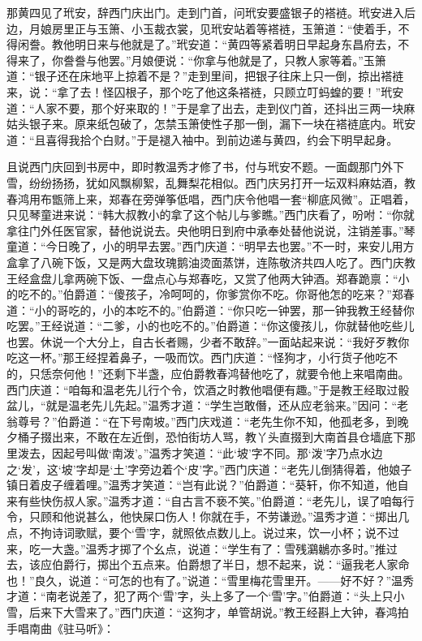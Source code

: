 那黄四见了玳安，辞西门庆出门。走到门首，问玳安要盛银子的褡裢。玳安进入后边，月娘房里正与玉箫、小玉裁衣裳，见玳安站着等褡裢，玉箫道：“使着手，不得闲誊。教他明日来与他就是了。”玳安道：“黄四等紧着明日早起身东昌府去，不得来了，你誊誊与他罢。”月娘便说：“你拿与他就是了，只教人家等着。”玉箫道：“银子还在床地平上掠着不是？”走到里间，把银子往床上只一倒，掠出褡裢来，说：“拿了去！怪囚根子，那个吃了他这条褡裢，只顾立叮蚂蝗的要！”玳安道：“人家不要，那个好来取的！”于是拿了出去，走到仪门首，还抖出三两一块麻姑头银子来。原来纸包破了，怎禁玉箫使性子那一倒，漏下一块在褡裢底内。玳安道：“且喜得我拾个白财。”于是褪入袖中。到前边递与黄四，约会下明早起身。

且说西门庆回到书房中，即时教温秀才修了书，付与玳安不题。一面觑那门外下雪，纷纷扬扬，犹如风飘柳絮，乱舞梨花相似。西门庆另打开一坛双料麻姑酒，教春鸿用布甑筛上来，郑春在旁弹筝低唱，西门庆令他唱一套“柳底风微”。正唱着，只见琴童进来说：“韩大叔教小的拿了这个帖儿与爹瞧。”西门庆看了，吩咐：“你就拿往门外任医官家，替他说说去。央他明日到府中承奉处替他说说，注销差事。”琴童道：“今日晚了，小的明早去罢。”西门庆道：“明早去也罢。”不一时，来安儿用方盒拿了八碗下饭，又是两大盘玫瑰鹅油烫面蒸饼，连陈敬济共四人吃了。西门庆教王经盒盘儿拿两碗下饭、一盘点心与郑春吃，又赏了他两大钟酒。郑春跪禀：“小的吃不的。”伯爵道：“傻孩子，冷呵呵的，你爹赏你不吃。你哥他怎的吃来？”郑春道：“小的哥吃的，小的本吃不的。”伯爵道：“你只吃一钟罢，那一钟我教王经替你吃罢。”王经说道：“二爹，小的也吃不的。”伯爵道：“你这傻孩儿，你就替他吃些儿也罢。休说一个大分上，自古长者赐，少者不敢辞。”一面站起来说：“我好歹教你吃这一杯。”那王经捏着鼻子，一吸而饮。西门庆道：“怪狗才，小行货子他吃不的，只恁奈何他！”还剩下半盏，应伯爵教春鸿替他吃了，就要令他上来唱南曲。西门庆道：“咱每和温老先儿行个令，饮酒之时教他唱便有趣。”于是教王经取过骰盆儿，“就是温老先儿先起。”温秀才道：“学生岂敢僭，还从应老翁来。”因问：“老翁尊号？”伯爵道：“在下号南坡。”西门庆戏道：“老先生你不知，他孤老多，到晚夕桶子掇出来，不敢在左近倒，恐怕街坊人骂，教丫头直掇到大南首县仓墙底下那里泼去，因起号叫做‘南泼’。”温秀才笑道：“此‘坡’字不同。那‘泼’字乃点水边之‘发’，这‘坡’字却是‘土’字旁边着个‘皮’字。”西门庆道：“老先儿倒猜得着，他娘子镇日着皮子缠着哩。”温秀才笑道：“岂有此说？”伯爵道：“葵轩，你不知道，他自来有些快伤叔人家。”温秀才道：“自古言不亵不笑。”伯爵道：“老先儿，误了咱每行令，只顾和他说甚么，他快屎口伤人！你就在手，不劳谦逊。”温秀才道：“掷出几点，不拘诗词歌赋，要个‘雪’字，就照依点数儿上。说过来，饮一小杯；说不过来，吃一大盏。”温秀才掷了个幺点，说道：“学生有了：雪残鸂鶒亦多时。”推过去，该应伯爵行，掷出个五点来。伯爵想了半日，想不起来，说：“逼我老人家命也！”良久，说道：“可怎的也有了。”说道：“雪里梅花雪里开。——好不好？”温秀才道：“南老说差了，犯了两个‘雪’字，头上多了一个‘雪’字。”伯爵道：“头上只小雪，后来下大雪来了。”西门庆道：“这狗才，单管胡说。”教王经斟上大钟，春鸿拍手唱南曲《驻马听》：

